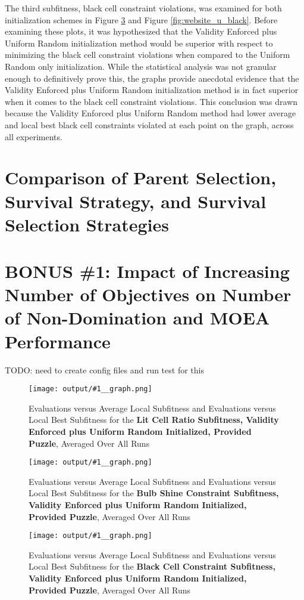 \documentclass[11pt]{article}
\newcommand{\fitnessplotcaption}[1]{\caption{Evaluations versus Average Local Subfitness and Evaluations versus 
    Local Best Subfitness for the \textbf{{#1}}, Averaged Over All Runs}}
\newcommand{\addgraphic}[1]{\centerline{\texttt{[image: output/\#1\_\_graph.png]}}}
\begin{document}
The third subfitness, black cell constraint violations, was examined for both initialization
schemes in Figure \ref{fig:website_v_black} and Figure \ref{fig:website_u_black}. Before examining
these plots, it was hypothesized that the Validity Enforced plus Uniform Random initialization 
method would be superior with respect to minimizing the black cell constraint violations when compared
to the Uniform Random only initialization. While the statistical analysis was not granular enough to
definitively prove this, the graphs provide anecdotal evidence that the Validity Enforced plus Uniform
Random initialization method is in fact superior when it comes to the black cell constraint violations.
This conclusion was drawn because the Validity Enforced plus Uniform Random method had lower average and
local best black cell constraints violated at each point on the graph, across all experiments.


\section{Comparison of Parent Selection, Survival Strategy, and Survival Selection Strategies}


\section{BONUS \#1: Impact of Increasing Number of Objectives on Number of Non-Domination and MOEA Performance}

TODO: need to create config files and run test for this



\begin{figure}
    \addgraphic{website_puzzle/website_puzzle_lit_cell_ratio}
    \fitnessplotcaption{Lit Cell Ratio Subfitness, Validity Enforced plus Uniform Random Initialized, Provided Puzzle}
    \label{fig:website_v_ratio}
\end{figure}

\begin{figure}
    \addgraphic{website_puzzle/website_puzzle_bulb_shine_constr}
    \fitnessplotcaption{Bulb Shine Constraint Subfitness, Validity Enforced plus Uniform Random Initialized, Provided Puzzle}
    \label{fig:website_v_shine}
\end{figure}

\begin{figure}
    \addgraphic{website_puzzle/website_puzzle_black_cell_constr}
    \fitnessplotcaption{Black Cell Constraint Subfitness, Validity Enforced plus Uniform Random Initialized, Provided Puzzle}
    \label{fig:website_v_black}
\end{figure}
\end{document}
